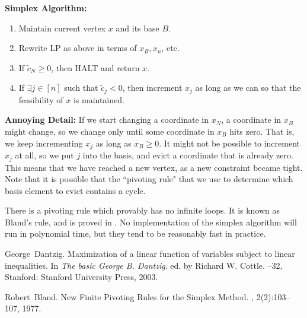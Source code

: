 \documentclass[11pt]{article}
\begin{document}
{\bf Simplex Algorithm:}

\begin{enumerate}
\item{Maintain current vertex $x$ and its base $B$.}
\item{Rewrite LP as above in terms of $x_B,x_n$, etc.}
\item{If $\tilde{c}_N\ge 0$, then HALT and return $x$.}
\item{If $\exists j\in [n]$ such that $\tilde{c}_j<0$, then increment $x_j$ as long as we can so that the feasibility of $x$ is maintained.}
\end{enumerate}

{\bf Annoying Detail:} If we start changing a coordinate in $x_N$, a coordinate in $x_B$ might change, so we change only until some coordinate in $x_B$ hits zero. That is, we keep incrementing $x_j$ as long as $x_B\ge 0$. It might not be possible to increment $x_j$ at all, so we put $j$ into the basis, and evict a coordinate that is already zero. This means that we have reached a new vertex, as a new constraint became tight. Note that it is possible that the ``pivoting rule" that we use to determine which basis element to evict contains a cycle.

There is a pivoting rule which provably has no infinite loops. It is known as Bland's rule, and is proved in \cite{BlandMOR77}. No implementation of the simplex algorithm will run in polynomial time, but they tend to be reasonably fast in practice.



\begin{thebibliography}{42}

George~Dantzig.
\newblock Maximization of a linear function of variables subject to linear inequalities.
\newblock In {\em The basic George B. Dantzig}.
\newblock ed. by Richard W. Cottle.
--32, Stanford: Stanford University Press, 2003.

Robert~Bland.
\newblock New Finite Pivoting Rules for the Simplex Method.
, 2(2):103--107, 1977.

\end{thebibliography}
\end{document}
